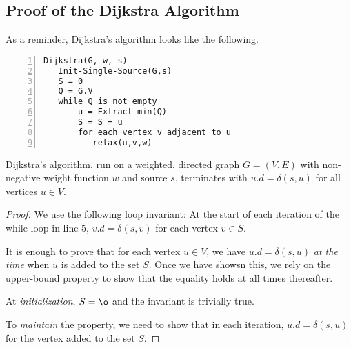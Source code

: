 \subsection{Proof of the Dijkstra Algorithm}

As a reminder, Dijkstra's algorithm looks like the following.

\begin{Verbatim}[numbers=left, xleftmargin=5mm]
Dijkstra(G, w, s)
   Init-Single-Source(G,s)
   S = 0
   Q = G.V
   while Q is not empty
       u = Extract-min(Q)
       S = S + u
       for each vertex v adjacent to u
          relax(u,v,w)
\end{Verbatim}

\begin{theorem} Dijkstra's algorithm, run on a weighted, directed graph $G = (V,E)$ with non-negative weight function $w$ and source $s$, terminates with $u.d = \delta(s,u)$ for all vertices $u \in V$.
\end{theorem}

\begin{proof} We use the following loop invariant: At the start of each iteration of the while loop in line $5$, $v.d = \delta(s,v)$ for each vertex $v \in S$.

  It is enough to prove that for each vertex $u \in V$, we have $u.d = \delta(s,u)$ \emph{at the time} when $u$ is added to the set $S$. Once we have showsn this, we rely on the upper-bound property to show that the equality holds at all times thereafter.

  At \emph{initialization}, $S = \o$ and the invariant is trivially true.

  To \emph{maintain} the property, we need to show that in each iteration, $u.d = \delta(s,u)$ for the vertex added to the set $S$.

  
\end{proof}

